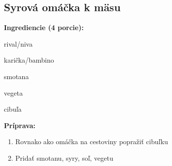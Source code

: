 \setcounter{step}{0}

\subsection{ Syrová omáčka k mäsu }

\begin{ingredient}
  
  \def\portions{  }
  \textbf{ {\normalsize Ingrediencie (4 porcie):} }

  \begin{main}
      \item rival/niva
      \item karička/bambino
      \item smotana
      \item vegeta
      \item cibuľa
  \end{main}
  
\end{ingredient}
\begin{recipe}
\textbf{ {\normalsize Príprava:} }
\begin{enumerate}

  \item{Rovnako ako omáčka na cestoviny popražiť cibuľku}
  \item{Pridať smotanu, syry, soľ, vegetu}

\end{enumerate}
\end{recipe}

\begin{notes}
  
\end{notes}	
\clearpage
